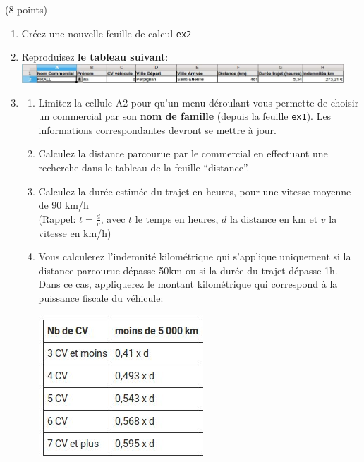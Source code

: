 \documentclass[a4paper]{article}
\begin{document}
\exost (8 points)
%
\begin{enumerate}
 \item Cr\'eez une nouvelle feuille de calcul \verb?ex2?
 \item Reproduisez \textbf{le tableau suivant}: \\ \includegraphics[width=0.95\textwidth]{feuille.jpg}
 \item \begin{enumerate}
        \item Limitez la cellule A2 pour qu'un menu d\'eroulant vous permette de choisir un commercial par son \textbf{nom de famille} (depuis la feuille \verb?ex1?). Les informations correspondantes devront se mettre \`a jour.  %
        \item Calculez la distance parcourue par le commercial en effectuant une recherche dans le tableau de la feuille ``distance''.   %
        \item Calculez la dur\'ee estim\'ee du trajet en heures, pour une vitesse moyenne de 90 km/h\\(Rappel: $t = \frac{d}{v}$, avec $t$ le temps en heures, $d$ la distance en km et $v$ la vitesse en km/h)
        \item \begin{minipage}{0.75\linewidth} %
        Vous calculerez l'indemnit\'e kilom\'etrique qui s'applique uniquement si la distance parcourue d\'epasse 50km ou si la dur\'ee du trajet d\'epasse 1h. Dans ce cas, appliquerez le montant kilom\'etrique qui correspond \`a la puissance fiscale du v\'ehicule:
        \end{minipage} %
        \begin{minipage}{0.25\linewidth}
         \includegraphics[width=\textwidth]{kilometres.jpg}
        \end{minipage}     
       \end{enumerate}
\end{enumerate}
\end{document}
